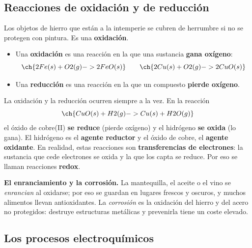 \subsection{Reacciones de oxidación y de reducción}

Los objetos de hierro que están a la intemperie se cubren de herrumbre si no se protegen con pintura. Es una \textbf{oxidación}.
\begin{itemize}
    \item Una \textbf{oxidación} es una reacción en la que una sustancia \textbf{gana oxígeno}:
    \[ \ch{2 Fe (s) + O2 (g) -> 2 FeO (s)} \qquad \ch{2 Cu (s) + O2 (g) -> 2 CuO (s)} \]
    \item Una \textbf{reducción} es una reacción en la que un compuesto \textbf{pierde oxígeno}.
\end{itemize}
La oxidación y la reducción ocurren siempre a la vez. En la reacción
\[ \ch{CuO (s) + H2 (g) -> Cu (s) + H2O (g)} \]
el óxido de cobre(II) \textbf{se reduce} (pierde oxígeno) y el hidrógeno \textbf{se oxida} (lo gana). El hidrógeno es el \textbf{agente reductor} y el óxido de cobre, el \textbf{agente oxidante}. En realidad, estas reacciones son \textbf{transferencias de electrones}: la sustancia que cede electrones se oxida y la que los capta se reduce. Por eso se llaman reacciones \textbf{redox}.

\begin{remark}
    \textbf{El enranciamiento y la corrosión.} La mantequilla, el aceite o el vino se \emph{enrancian} al oxidarse; por eso se guardan en lugares frescos y oscuros, y muchos alimentos llevan antioxidantes. La \emph{corrosión} es la oxidación del hierro y del acero no protegidos: destruye estructuras metálicas y prevenirla tiene un coste elevado.
\end{remark}

\subsection{Los procesos electroquímicos}

